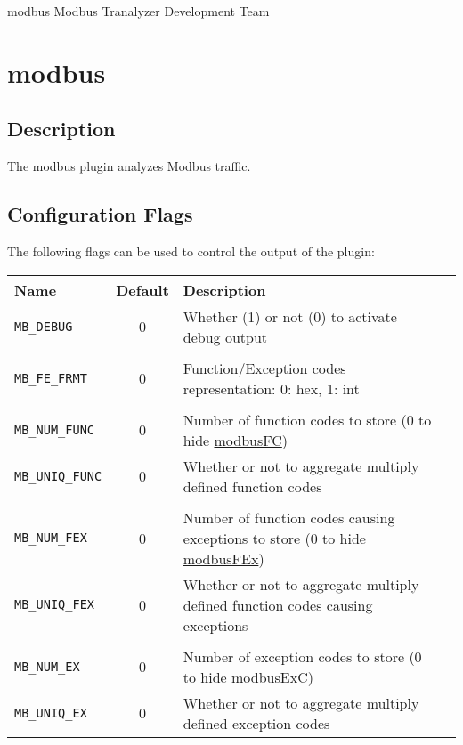 \documentclass[documentation]{subfiles}
\begin{document}
\trantitle
    {modbus} %
    {Modbus} %
    {Tranalyzer Development Team} %

\section{modbus}\label{s:modbus}

\subsection{Description}
The modbus plugin analyzes Modbus traffic.


\subsection{Configuration Flags}
The following flags can be used to control the output of the plugin:
\begin{longtable}{lcll}
    \toprule
    {\bf Name} & {\bf Default} & {\bf Description}\\
    \midrule\endhead%
    {\tt MB\_DEBUG}      & 0 & Whether (1) or not (0) to activate debug output\\\\
    {\tt MB\_FE\_FRMT}   & 0 & Function/Exception codes representation: 0: hex, 1: int\\\\
    {\tt MB\_NUM\_FUNC}  & 0 & Number of function codes to store (0 to hide \hyperref[modbusFC]{modbusFC})\\
    {\tt MB\_UNIQ\_FUNC} & 0 & Whether or not to aggregate multiply defined function codes\\\\
    {\tt MB\_NUM\_FEX}   & 0 & Number of function codes causing exceptions to store (0 to hide \hyperref[modbusFEx]{modbusFEx})\\
    {\tt MB\_UNIQ\_FEX}  & 0 & Whether or not to aggregate multiply defined function codes causing exceptions\\\\
    {\tt MB\_NUM\_EX}    & 0 & Number of exception codes to store (0 to hide \hyperref[modbusExC]{modbusExC})\\
    {\tt MB\_UNIQ\_EX}   & 0 & Whether or not to aggregate multiply defined exception codes\\
    \bottomrule
\end{longtable}
\end{document}
